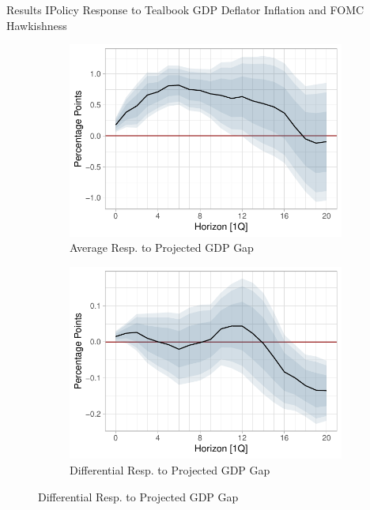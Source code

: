 \documentclass[11pt,pdf,aspectratio=129]{beamer}
\begin{document}
\begin{frame}{Results I}{Policy Response to Tealbook GDP Deflator Inflation and FOMC Hawkishness}
\begin{figure}[!htbp]
\begin{minipage}{.9\textwidth}
\begin{subfigure}[b]{0.495\textwidth}
          \end{subfigure}\vspace{2ex}
          \begin{subfigure}[b]{0.495\textwidth}\centering
            \caption{Average Resp. to Projected GDP Gap}
            \label{fig:LP_short:average_gap}
            \includegraphics[width=\linewidth]{average_gap_short.pdf}
          \end{subfigure} \hfill
          \begin{subfigure}[b]{0.495\textwidth}\centering
            \caption{Differential Resp. to Projected GDP Gap}
            \label{fig:LP_short:differential_gap}
            \includegraphics[width=\linewidth]{differential_gap_short.pdf}
          \end{subfigure}

\end{minipage}
\end{figure}
\end{frame}
\end{document}

